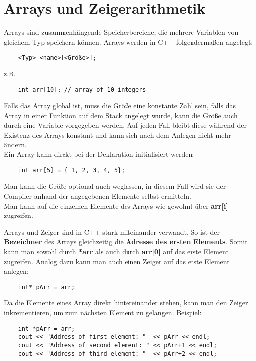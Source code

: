 \section{Arrays und Zeigerarithmetik}
Arrays sind zusammenhängende Speicherbereiche, die mehrere Variablen von gleichem Typ speichern können.
Arrays werden in C++ folgendermaßen angelegt:

\begin{lstlisting}
	<Typ> <name>[<Größe>];
\end{lstlisting}

z.B.
\begin{lstlisting}
	int arr[10]; // array of 10 integers
\end{lstlisting}

Falls das Array global ist, muss die Größe eine konstante Zahl sein, falls das Array in einer Funktion auf dem Stack angelegt wurde, kann die Größe auch durch eine Variable vorgegeben werden.
Auf jeden Fall bleibt diese während der Existenz des Arrays konstant und kann sich nach dem Anlegen nicht mehr ändern.\\
Ein Array kann direkt bei der Deklaration initialisiert werden:
\begin{lstlisting}
	int arr[5] = { 1, 2, 3, 4, 5};
\end{lstlisting}
Man kann die Größe optional auch weglassen, in diesem Fall wird sie der Compiler anhand der angegebenen Elemente selbst ermitteln. \\

Man kann auf die einzelnen Elemente des Arrays wie gewohnt über 
\textbf{arr[i]}
zugreifen.

Arrays und Zeiger sind in C++ stark miteinander verwandt.
So ist der \textbf{Bezeichner} des Arrays gleichzeitig die \textbf{Adresse des ersten Elements}.
Somit kann man sowohl durch \textbf{*arr} als auch durch \textbf{arr[0]} auf das erste Element zugreifen.
Analog dazu kann man auch einen Zeiger auf das erste Element anlegen:
\begin{lstlisting}
	int* pArr = arr;
\end{lstlisting}
Da die Elemente eines Array direkt hintereinander stehen, kann man den Zeiger inkrementieren, um zum  nächsten Element zu gelangen.
Beispiel:

\begin{lstlisting}
	int *pArr = arr;
	cout << "Address of first element: "  << pArr << endl;
	cout << "Address of second element: " << pArr+1 << endl;
	cout << "Address of third element: "  << pArr+2 << endl;
\end{lstlisting}

